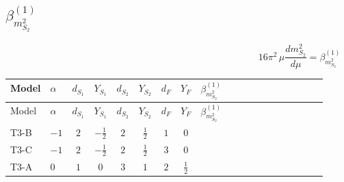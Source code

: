 \documentclass{article}
\begin{document}
\begin{landscape}
\section*{$\beta_{m_{S_2}^2}^{(1)}$}
\[16\pi^2\,\mu\frac{d m_{S_2}^2}{d\mu}=\beta_{m_{S_2}^2}^{(1)}\]
\tiny
\begin{longtable}{@{}llcccccc >{\raggedright\arraybackslash}p{0.54\linewidth}@{}}
\toprule
Model & $\alpha$ & $d_{S_1}$ & $Y_{S_1}$ & $d_{S_2}$ & $Y_{S_2}$ & $d_F$ & $Y_F$ & $\beta_{m_{S_2}^2}^{(1)}$ \\
\midrule
\endfirsthead
\toprule
Model & $\alpha$ & $d_{S_1}$ & $Y_{S_1}$ & $d_{S_2}$ & $Y_{S_2}$ & $d_F$ & $Y_F$ & $\beta_{m_{S_2}^2}^{(1)}$ \\
\midrule
\endhead
T3-B & $-1$ & $2$ & $-\frac{1}{2}$ & $2$ & $\frac{1}{2}$ & $1$ & $0$ & \scriptsize\adjustbox{max width=\linewidth}{$\begin{gathered} {m_{S_2}^2} (2 \operatorname{Tr}\!\left({y_2}\,\left({y_2}\right)^{\dagger}\right)+6 {\lambda_{S_2}}) \\ -8 \operatorname{Tr}\!\left({M_F}\,\left({M_F}\right)^{*}\,\left({y_2}\right)^{T}\,\left({y_2}\right)^{*}\right) \\ -8 \operatorname{Tr}\!\left({M_F}\,\left({y_2}\right)^{\dagger}\,{y_2}\,\left({M_F}\right)^{*}\right) \\ -\frac{9 {g_2}^2 {m_{S_2}^2}}{2} \\ -\frac{3 {g_Y}^2 {m_{S_2}^2}}{2} \\ +4 {\lambda_{12}} {m_{S_1}^2}\end{gathered}$} \\
\midrule
T3-C & $-1$ & $2$ & $-\frac{1}{2}$ & $2$ & $\frac{1}{2}$ & $3$ & $0$ & \scriptsize\adjustbox{max width=\linewidth}{$\begin{gathered} {m_{S_2}^2} (3 \operatorname{Tr}\!\left({y_2}\,\left({y_2}\right)^{\dagger}\right)+6 {\lambda_{S_2}}) \\ -12 \operatorname{Tr}\!\left({M_F}\,\left({M_F}\right)^{*}\,\left({y_2}\right)^{T}\,\left({y_2}\right)^{*}\right) \\ -12 \operatorname{Tr}\!\left({M_F}\,\left({y_2}\right)^{\dagger}\,{y_2}\,\left({M_F}\right)^{*}\right) \\ -\frac{9 {g_2}^2 {m_{S_2}^2}}{2} \\ -\frac{3 {g_Y}^2 {m_{S_2}^2}}{2} \\ +4 {\lambda_{12}} {m_{S_1}^2}\end{gathered}$} \\
\midrule
T3-A & $0$ & $1$ & $0$ & $3$ & $1$ & $2$ & $\frac{1}{2}$ & \scriptsize\adjustbox{max width=\linewidth}{$\begin{gathered} {m_{S_2}^2} (2 \operatorname{Tr}\!\left({y_2}\,\left({y_2}\right)^{\dagger}\right)+8 {\lambda_{S_2}}+4 {\lambda_{S_2}^{\rm Adj}}) \\ -4 \operatorname{Tr}\!\left({M_F}\,\left({y_2}\right)^{\dagger}\,{y_2}\,\left({M_F}\right)^{\dagger}\right) \\ -12 {g_2}^2 {m_{S_2}^2} \\ -6 {g_Y}^2 {m_{S_2}^2} \\ +2 {\lambda_{12}} {m_{S_1}^2}\end{gathered}$} \\

\end{longtable}
\end{landscape}
\end{document}
